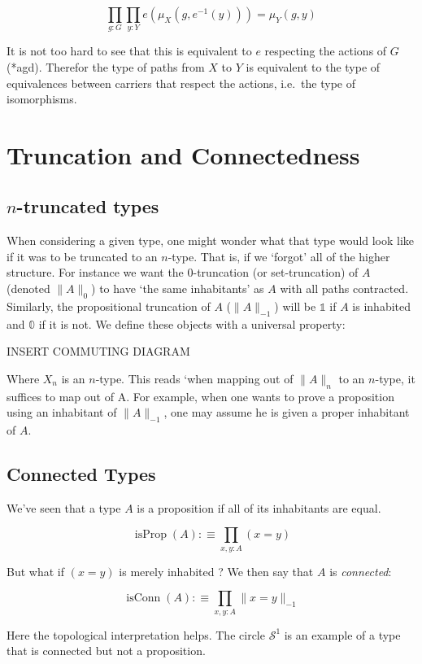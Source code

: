 \documentclass{article}
\DeclareMathOperator{\isprop}{isProp}
\DeclareMathOperator{\isconn}{isConn}
\begin{document}
\[\prod_{g : G} \prod_{y : Y} e(\mu_{X}(g, e^{-1}(y))) = \mu_{Y}(g, y)\]

It is not too hard to see that this is equivalent to $e$ respecting the actions of $G$ (*agd). Therefor the type of paths from $X$ to $Y$ is equivalent to the type of equivalences between carriers that respect the actions, i.e.\ the type of isomorphisms.

\section{Truncation and Connectedness}

\subsection{$n$-truncated types}\label{trunc}

When considering a given type, one might wonder what that type would look like if it was to be truncated to an $n$-type. That is, if we `forgot' all of the higher structure. For instance we want the $0$-truncation (or set-truncation) of $A$ (denoted $\|A\|_{0}$) to have `the same inhabitants' as $A$ with all paths contracted. Similarly, the propositional truncation of $A$ ($\|A\|_{-1}$) will be $\mathbb{1}$ if $A$ is inhabited and $\mathbb{0}$ if it is not. We define these objects with a universal property:

INSERT COMMUTING DIAGRAM

Where $X_{n}$ is an $n$-type. This reads `when mapping out of $\|A\|_{n}$ to an $n$-type, it suffices to map out of A. For example, when one wants to prove a proposition using an inhabitant of $\|A\|_{-1}$, one may assume he is given a proper inhabitant of $A$.

\subsection{Connected Types}

We've seen that a type $A$ is a proposition if all of its inhabitants are equal.

\[\isprop(A) :\equiv \prod_{x,y : A} (x = y)\]

But what if $(x = y)$ is merely inhabited ? We then say that $A$ is \emph{connected}:

\[\isconn(A) :\equiv \prod_{x,y : A} \|x = y \|_{-1}\]

Here the topological interpretation helps. The circle $\mathcal{S}^{1}$ is an example of a type that is connected but not a proposition.
\end{document}
